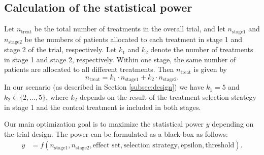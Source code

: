 \documentclass[bimj,fleqn]{w-art}
\theoremstyle{plain}
\theoremstyle{definition}
\begin{document}
\subsection{Calculation of the statistical power}

Let $n_{\text{treat}}$ be the total number of treatments in the overall trial, and let $n_{\text{stage1}}$ and $n_{\text{stage2}}$ be the numbers of patients allocated to each treatment in stage 1 and stage 2 of the trial, respectively. Let $k_1$ and $k_2$ denote the number of treatments in stage 1 and stage 2, respectively. Within one stage, the same number of patients are allocated to all different treatments. Then $n_{\text{treat}}$ is given by
\begin{equation}
  \label{eq:ntreat}
  n_{\text{treat}} = k_1 \cdot n_{\text{stage1}} + k_2 \cdot n_{\text{stage2}}.
\end{equation}
In our scenario (as described in Section \ref{subsec:design}) we have $k_1 = 5$ and $k_2 \in \{2, \ldots, 5\}$, where $k_2$ depends on the result of the treatment selection strategy in stage 1 and the control treatment is included in both stages.

Our main optimization goal is to maximize the statistical power $y$ depending on the trial design. The power can be formulated as a black-box as follows:
\begin{align}
  \label{eq:bbox}
  y & = f(n_{\text{stage1}}, n_{\text{stage2}}, \text{effect set}, \text{selection strategy}, \text{epsilon}, \text{threshold}).
\end{align}
\end{document}
